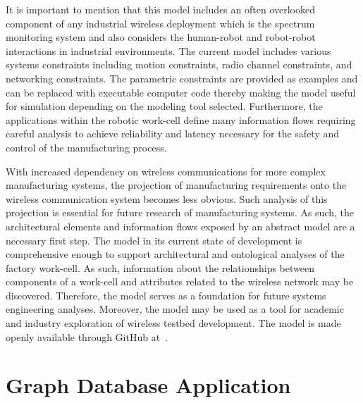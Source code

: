 It is important to mention that this model includes an often overlooked component of any industrial wireless deployment which is the spectrum monitoring system and also considers the human-robot and robot-robot interactions in industrial environments. The current model includes various systems constraints including motion constraints, radio channel constraints, and networking constraints. The parametric constraints are provided as examples and can be replaced with executable computer code thereby making the model useful for simulation depending on the modeling tool selected. Furthermore, the applications within the robotic work-cell define many information flows requiring careful analysis to achieve reliability and latency necessary for the safety and control of the manufacturing process.

With increased dependency on wireless communications for more complex manufacturing systems, the projection of manufacturing requirements onto the wireless communication system becomes less obvious. Such analysis of this projection is essential for future research of manufacturing systems. As such, the architectural elements and information flows exposed by an abstract model
are a necessary first step. The model in its current state of development is comprehensive enough to support architectural and ontological analyses of the factory work-cell.  As such, information about the relationships between components of a work-cell and attributes related to the wireless network may be discovered. Therefore, the model serves as a foundation for future systems engineering analyses. Moreover, the model may be used as a tool for academic and industry exploration of wireless testbed development.  The model is made openly available through GitHub at~\cite{SysML.Candell2018}.

\section{Graph Database Application}

